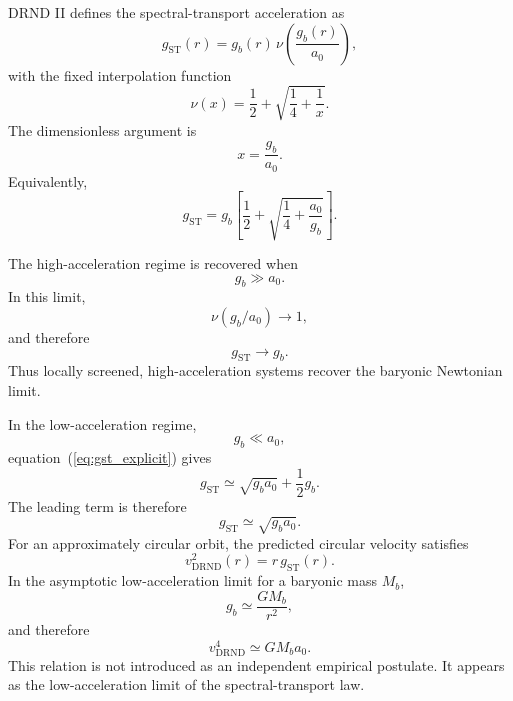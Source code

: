 \documentclass[12pt]{iopart}
\begin{document}
DRND II defines the spectral-transport acceleration as
\begin{equation}
g_{\mathrm{ST}}(r)
=
g_b(r)\,
\nu\!\left(\frac{g_b(r)}{a_0}\right),
\label{eq:gst_def}
\end{equation}
with the fixed interpolation function
\begin{equation}
\nu(x)
=
\frac12+\sqrt{\frac14+\frac1x}.
\label{eq:nu_def}
\end{equation}
The dimensionless argument is
\begin{equation}
x=\frac{g_b}{a_0}.
\end{equation}
Equivalently,
\begin{equation}
g_{\mathrm{ST}}
=
g_b
\left[
\frac12+
\sqrt{
\frac14+\frac{a_0}{g_b}
}
\right].
\label{eq:gst_explicit}
\end{equation}

The high-acceleration regime is recovered when
\begin{equation}
g_b\gg a_0.
\end{equation}
In this limit,
\begin{equation}
\nu(g_b/a_0)\rightarrow 1,
\end{equation}
and therefore
\begin{equation}
g_{\mathrm{ST}}\rightarrow g_b.
\end{equation}
Thus locally screened, high-acceleration systems recover the baryonic Newtonian limit.

In the low-acceleration regime,
\begin{equation}
g_b\ll a_0,
\end{equation}
equation~(\ref{eq:gst_explicit}) gives
\begin{equation}
g_{\mathrm{ST}}
\simeq
\sqrt{g_b a_0}
+
\frac12 g_b.
\label{eq:low_accel_limit}
\end{equation}
The leading term is therefore
\begin{equation}
g_{\mathrm{ST}}
\simeq
\sqrt{g_b a_0}.
\end{equation}
For an approximately circular orbit, the predicted circular velocity satisfies
\begin{equation}
v_{\mathrm{DRND}}^2(r)
=
r\,g_{\mathrm{ST}}(r).
\label{eq:v_drnd}
\end{equation}
In the asymptotic low-acceleration limit for a baryonic mass \(M_b\),
\begin{equation}
g_b\simeq \frac{GM_b}{r^2},
\end{equation}
and therefore
\begin{equation}
v_{\mathrm{DRND}}^4
\simeq
GM_ba_0.
\label{eq:btfr_limit}
\end{equation}
This relation is not introduced as an independent empirical postulate. It appears as the low-acceleration limit of the spectral-transport law.
\end{document}
